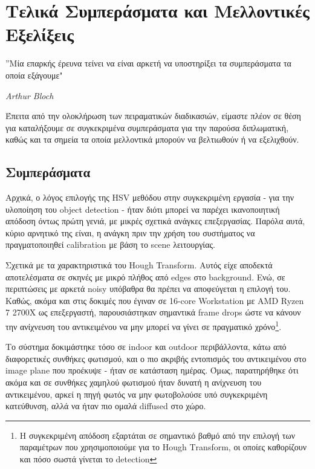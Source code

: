 \chapter{Τελικά Συμπεράσματα και Μελλοντικές Ε\-ξε\-λί\-ξεις} %
\label{chap:Chapter7}

\epigraph{”Μία επαρκής έρευνα τείνει να είναι αρκετή να υποστηρίξει τα συμπεράσματα τα οποία εξάγουμε"}{\textit{Arthur Bloch}}

Έπειτα από την ολοκλήρωση των πειραματικών διαδικασιών, είμαστε πλέον σε θέση για καταλήξουμε σε συγκεκριμένα συμπεράσματα για την παρούσα διπλωματική,
καθώς και τα σημεία τα οποία μελλοντικά μπορούν να βελτιωθούν ή να εξελιχθούν. 

\section{Συμπεράσματα}
Αρχικά, ο λόγος επιλογής της HSV μεθόδου στην συγκεκριμένη εργασία - για την υλοποίηση του object detection - ήταν διότι μπορεί να παρέχει ικανοποιητική απόδοση όντως πρώτη γενιά, με μικρές σχετικά ανάγκες επεξεργασίας. Παρόλα αυτά, κύριο αρνητικό της είναι, η ανάγκη πριν την χρήση του συστήματος να πραγματοποιηθεί calibration με βάση το scene λειτουργίας. 

Σχετικά με τα χαρακτηριστικά του Hough Transform. Αυτός είχε αποδεκτά α\-πο\-τε\-λέ\-σμα\-τα σε σκηνές με μικρό πλήθος από edges στο background. Ενώ, σε περιπτώσεις με αρκετά noisy υπόβαθρα θα πρέπει να αποφεύγεται η επιλογή του. Καθώς, ακόμα και στις δοκιμές που έγιναν σε 16-core Workstation με AMD Ryzen 7 2700X ως επεξεργαστή, παρουσιάστηκαν σημαντικά frame drops ώστε να κάνουν την ανίχνευση του αντικειμένου να μην μπορεί να γίνει σε πραγματικό χρόνο\footnote{Η συγκεκριμένη απόδοση εξαρτάται σε σημαντικό βαθμό από την επιλογή των παραμέτρων που χρησιμοποιούμε για το Hough Τransform, οι οποίες καθορίζουν και πόσο σωστά γίνεται το detection}. 

Το σύστημα δοκιμάστηκε τόσο σε indoor και outdoor περιβάλλοντα, κάτω από διαφορετικές συνθήκες φωτισμού, και ο πιο ακριβής εντοπισμός του αντικειμένου στο image plane που προέκυψε - ήταν σε κατάσταση ημέρας. Όμως, παρατηρήθηκε ότι ακόμα και σε συνθήκες χαμηλού φωτισμού ήταν δυνατή η ανίχνευση του αντικειμένου, αρκεί η πηγή φωτός να μην φωτοβολούσε υπό συγκεκριμένη κατεύθυνση, αλλά να ήταν πιο ομαλά diffused στο χώρο.

